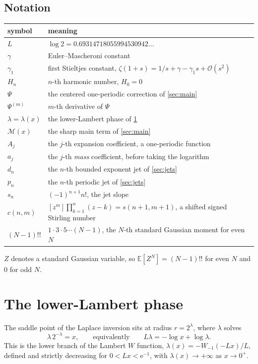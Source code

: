 \documentclass[11pt,oneside]{article}
\theoremstyle{definition}
\theoremstyle{remark}
\newcommand{\e}{\mathrm e}
\newcommand{\E}{\mathbb E}
\newcommand{\bigO}{\mathcal O}
\begin{document}
\subsection{Notation}

\begin{center}
\begin{tabular}{@{}ll@{}}
\toprule
symbol & meaning\\
\midrule
$L$ & $\log2=0.69314718055994530942\dots$\\
$\gamma$ & Euler--Mascheroni constant\\
$\gamma_1$ & first Stieltjes constant, $\zeta(1+s)=1/s+\gamma-\gamma_1s+\bigO(s^2)$\\
$H_n$ & $n$-th harmonic number, $H_0=0$\\
$\Psi$ & the centered one-periodic correction of \cref{sec:main}\\
$\Psi^{(m)}$ & $m$-th derivative of $\Psi$\\
$\lambda=\lambda(x)$ & the lower-Lambert phase of \cref{sec:lambert}\\
$\mathcal M(x)$ & the sharp main term of \cref{sec:main}\\
$A_j$ & the $j$-th expansion coefficient, a one-periodic function\\
$a_j$ & the $j$-th \emph{mass} coefficient, before taking the logarithm\\
$d_n$ & the $n$-th bounded exponent jet of \cref{sec:jets}\\
$p_n$ & the $n$-th periodic jet of \cref{sec:jets}\\
$s_n$ & $(-1)^{n+1}n!$, the jet slope\\
$c(n,m)$ & $[z^m]\prod_{k=1}^n(z-k)=s(n+1,m+1)$, a shifted signed Stirling number\\
$(N-1)!!$ & $1\cdot3\cdot5\cdots(N-1)$, the $N$-th standard Gaussian moment for even $N$\\
\bottomrule
\end{tabular}
\end{center}

$Z$ denotes a standard Gaussian variable, so $\E[Z^N]=(N-1)!!$ for even $N$ and
$0$ for odd $N$.

\section{The lower-Lambert phase}\label{sec:lambert}

The saddle point of the Laplace inversion sits at radius $r=2^\lambda$, where
$\lambda$ solves
\begin{equation}\label{eq:lambda}
  \lambda\,2^{-\lambda}=x,
  \qquad\text{equivalently}\qquad
  L\lambda=-\log x+\log\lambda .
\end{equation}
This is the lower branch of the Lambert $W$ function,
$\lambda(x)=-W_{-1}(-Lx)/L$, defined and strictly decreasing for
$0<Lx<\e^{-1}$, with $\lambda(x)\to+\infty$ as $x\to0^+$.
\end{document}

